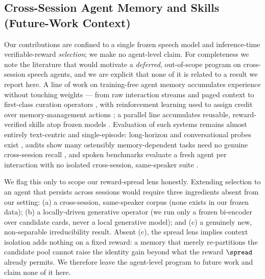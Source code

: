 \subsection{Cross-Session Agent Memory and Skills (Future-Work Context)}
\label{sec:rw-memory}

Our contributions are confined to a single frozen speech model and inference-time verifiable-reward \emph{selection}; we make no agent-level claim. For completeness we note the literature that would motivate a \emph{deferred}, out-of-scope program on cross-session speech agents, and we are explicit that none of it is related to a result we report here. A line of work on training-free agent memory accumulates experience without touching weights --- from raw interaction streams and paged context \citep{genagents2023,memgpt2023} to first-class curation operators \citep{mem0_2025}, with reinforcement learning used to assign credit over memory-management actions \citep{memoryr1_2025}; a parallel line accumulates reusable, reward-verified skills atop frozen models \citep{voyager2023,sokskills2026}. Evaluation of such systems remains almost entirely text-centric and single-episode: long-horizon and conversational probes exist \citep{longmemeval2024,locomo2024}, audits show many ostensibly memory-dependent tasks need no genuine cross-session recall \citep{anatomymem2026}, and spoken benchmarks evaluate a fresh agent per interaction \citep{urobench2025,voicebench2024} with no isolated cross-session, same-speaker suite \citep{amber2026}.

We flag this only to scope our reward-spread lens honestly. Extending selection to an agent that persists across sessions would require three ingredients absent from our setting: (a) a cross-session, same-speaker corpus (none exists in our frozen data); (b) a locally-driven generative operator (we run only a frozen bi-encoder over candidate cards, never a local generative model); and (c) a genuinely new, non-separable irreducibility result. Absent (c), the spread lens implies context isolation adds nothing on a fixed reward: a memory that merely re-partitions the candidate pool cannot raise the identity gain beyond what the reward $\spread$ already permits. We therefore leave the agent-level program to future work and claim none of it here.